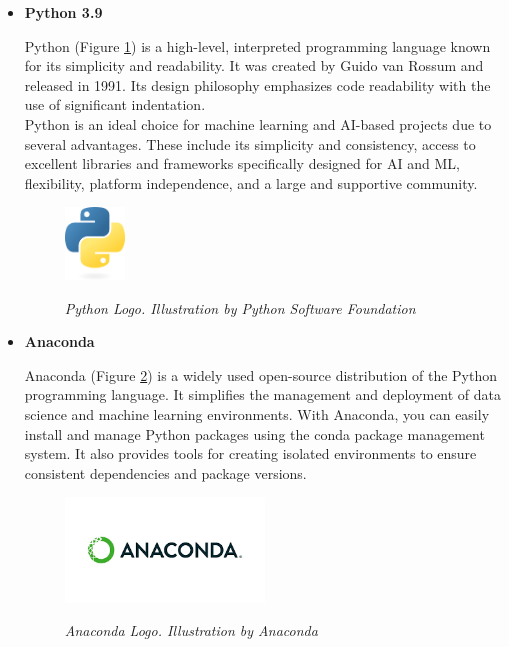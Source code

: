 \begin{itemize}
  \item \textbf{Python 3.9}

    Python (Figure \ref{fig:python-logo}) is a high-level, interpreted
    programming language known for its simplicity and readability. It was
    created by Guido van Rossum and released in 1991. Its design philosophy
    emphasizes code readability with the use of significant indentation. \\

    Python is an ideal choice for machine learning and AI-based projects due to
    several advantages. These include its simplicity and consistency, access to
    excellent libraries and frameworks specifically designed for AI and ML,
    flexibility, platform independence, and a large and supportive community.

    \newpage

    \begin{figure}[H]
      \centering
      \includegraphics[width=0.15\textwidth]{imatges/studies_and_decisions/python-logo-only.png}
      \caption[Python Logo]{\textit{Python Logo. Illustration by Python Software Foundation}}
      {\label{fig:python-logo}}
    \end{figure}

  \item \textbf{Anaconda}

    Anaconda (Figure \ref{fig:anaconda-logo}) is a widely used open-source distribution of the Python programming language. It simplifies the management and deployment of data science and machine learning environments. With Anaconda, you can easily install and manage Python packages using the conda package management system. It also provides tools for creating isolated environments to ensure consistent dependencies and package versions.

    \begin{figure}[H]
      \centering
      \begin{adjustbox}{trim=0cm 1cm 0cm 1cm, clip}
        \includegraphics[width=0.5\textwidth]{imatges/studies_and_decisions/anaconda-logo.png}
      \end{adjustbox}
      \caption[Anaconda Logo]{\textit{Anaconda Logo. Illustration by Anaconda}}
      {\label{fig:anaconda-logo}}
    \end{figure}


\end{itemize}
